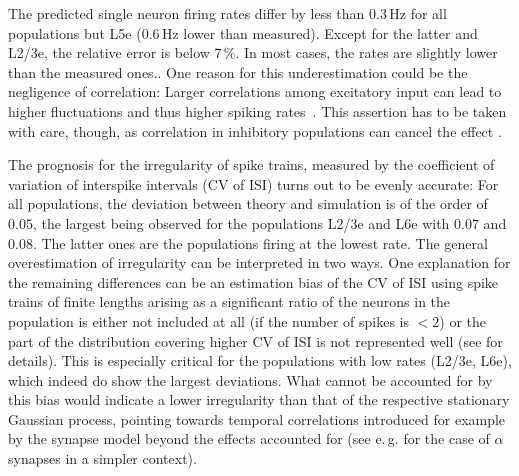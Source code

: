 The predicted single neuron firing rates differ by less than
$0.3$\,Hz for all populations but L5e ($0.6$\,Hz lower than measured). 
Except for the latter and L2/3e, the relative error is below $7\,\%$.
In most cases, the rates are slightly lower than the measured ones..
One reason for this underestimation could be the negligence of correlation: 
Larger correlations among excitatory input can lead to higher fluctuations 
and thus higher spiking rates~\cite{staude2010higher}. This 
assertion has to be taken with care, though, as correlation in inhibitory 
populations can cancel the effect . 

The prognosis for the irregularity of spike trains, measured by the coefficient of
variation of interspike intervals (CV of ISI) turns out to be evenly accurate:
For all populations, the deviation between theory and simulation is of the order 
of $0.05$, the largest being observed for the populations L2/3e and L6e with $0.07$ 
and $0.08$. The latter ones are the populations firing at the lowest rate. 
The general overestimation of irregularity can be interpreted in two ways. 
One explanation for the remaining differences can be an estimation bias of the CV of ISI 
using spike trains of finite lengths arising as a significant ratio of the neurons in the 
population is either not included at all (if the number of spikes is $ < 2$) or the part of the 
distribution covering higher CV of ISI is not represented well (see  for 
details). This is especially critical for the populations with low rates (L2/3e, L6e), 
which indeed do show the largest deviations.
What cannot be accounted for by this bias would indicate a lower irregularity than that 
of the respective stationary Gaussian process, pointing towards temporal correlations
introduced for example by the synapse model beyond the effects accounted for
(see e.\,g.  for the case of $\alpha$ synapses in a simpler context). 


